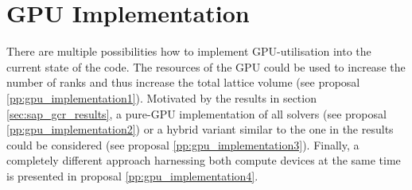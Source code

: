 \documentclass{article}
\theoremstyle{plain} %
\theoremstyle{convention} %
\theoremstyle{remark} %
\numberwithin{equation}{section}
\begin{document}
\section{GPU Implementation}

There are multiple possibilities how to implement GPU-utilisation into the current state of the code. The resources of the GPU could be used to increase the number of ranks and thus increase the total lattice volume (see proposal \ref{pp:gpu_implementation1}). Motivated by the results in section \ref{sec:sap_gcr_results}, a pure-GPU implementation of all solvers (see proposal \ref{pp:gpu_implementation2}) or a hybrid variant similar to the one in the results could be considered (see proposal \ref{pp:gpu_implementation3}). Finally, a completely different approach harnessing both compute devices at the same time is presented in proposal \ref{pp:gpu_implementation4}.
\end{document}
